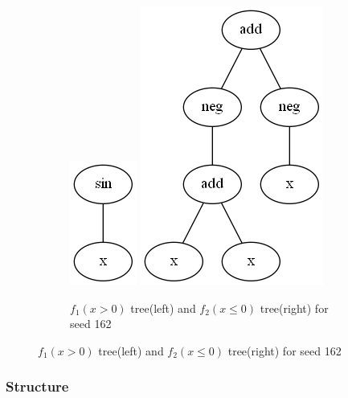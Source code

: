 \documentclass{article}
\begin{document}
\begin{figure}[h!]
	\centering
	\begin{subfigure}[b]{\linewidth}
		\includegraphics[width=0.5\linewidth]{ccgp_best_tree_162_1.png}
		\includegraphics[width=0.5\linewidth]{ccgp_best_tree_162_2.png}
		\caption{$f_1(x > 0)$ tree(left) and $f_2(x \le 0)$ tree(right) for seed 162}
	\end{subfigure}
\end{figure}
	
\subsubsection*{Structure}
\end{document}
